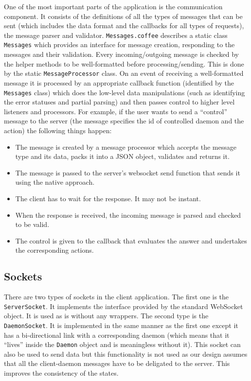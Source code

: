 \documentclass{l3proj}
\begin{document}
One of the most important parts of the application is the communication component. It consists of the definitions of all the types of messages thst can be sent (which includes the data format and the callbacks for all types of requests), the message parser and validator. \texttt{Messages.coffee} describes a static class \texttt{Messages} which provides an interface for message creation, responding to the messages and their validation. Every incoming/outgoing message is checked by the helper methods to be well-formatted before processing/sending. This is done by the static \texttt{MessageProcessor} class. On an event of receiving a well-formatted message it is processed by an appropriate callback function (identified by the \texttt{Messages} class) which does the low-level data manipulations (such as identifying the error statuses and partial parsing) and then passes control to higher level listeners and processors. For example, if the user wants to send a ``control'' message to the server (the message specifies the id of controlled daemon and the action) the following things happen:
\begin{itemize}
  \item The message is created by a message processor which accepts the message type and its data, packs it into a JSON object, validates and returns it.
  \item The message is passed to the server's websocket send function that sends it using the native approach.
  \item The client has to wait for the response. It may not be instant.
  \item When the response is received, the incoming message is parsed and checked to be valid.
  \item The control is given to the callback that evaluates the answer and undertakes the corresponding actions.
\end{itemize}

\subsection{Sockets}

There are two types of sockets in the client application. The first one is the \texttt{ServerSocket}. It implements the interface provided by the standard WebSocket object. It is used as is without any wrappers. The second type is the \texttt{DaemonSocket}. It is implemented in the same manner as the first one except it has a bi-directional link with a corresponding daemon (which means that it ``lives'' inside the \texttt{Daemon} object and is meaningless without it). This socket can also be used to send data but this functionality is not used as our design assumes that all the client-daemon messages have to be deligated to the server. This improves the consistency of the states.
\end{document}
